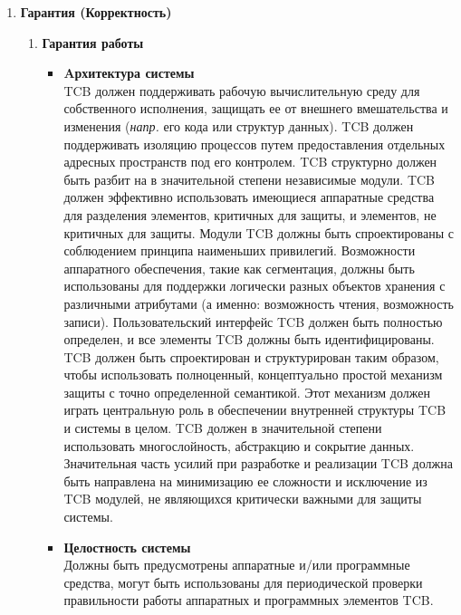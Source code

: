\begin{enumerate}
\begin{enumerate}
\begin{enumerate}
\begin{enumerate}
                разрушительное действие для прекращения возникновения событий.
            \end{enumerate}
            \item{\textbf{Гарантия (Корректность)}}
            \begin{enumerate}
            \item{\textbf{Гарантия работы}}
                \begin{itemize}
                    \item{\textbf{Aрхитектура системы}}\\
                    TCB должен поддерживать рабочую вычислительную среду для собственного исполнения, защищать ее от внешнего вмешательства и изменения  (\textit{напр.} его кода или структур данных).
                    TCB должен поддерживать изоляцию процессов путем предоставления отдельных адресных пространств под его контролем. TCB структурно должен быть разбит на в значительной степени
                    независимые модули. TCB должен эффективно использовать имеющиеся аппаратные средства для разделения элементов, критичных для защиты, и элементов, не критичных для защиты.
                    Модули TCB должны быть спроектированы с соблюдением принципа наименьших привилегий. Возможности аппаратного обеспечения, такие как сегментация, должны быть использованы
                    для поддержки логически разных объектов хранения с различными атрибутами (а именно: возможность чтения, возможность записи). Пользовательский интерфейс TCB должен быть полностью
                    определен, и все элементы TCB должны быть идентифицированы. TCB должен быть спроектирован и структурирован таким образом, чтобы использовать полноценный, концептуально
                    простой механизм защиты с точно определенной семантикой. Этот механизм должен играть центральную роль в обеспечении внутренней структуры TCB и системы в целом. TCB должен
                    в значительной степени использовать многослойность, абстракцию и сокрытие данных. Значительная часть усилий при разработке и реализации TCB должна быть направлена на
                    минимизацию ее сложности и исключение из TCB модулей, не являющихся критически важными для защиты системы.
                    \item{\textbf{Целостность системы}}\\
                    Должны быть предусмотрены аппаратные и/или программные средства, могут быть использованы для периодической проверки правильности работы аппаратных и программных элементов TCB.

\end{itemize}
\end{enumerate}
\end{enumerate}
\end{enumerate}
\end{enumerate}
